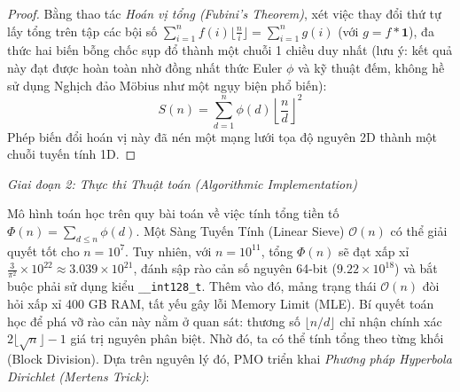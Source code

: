 \documentclass{article}
\begin{document}
\begin{proof}
Bằng thao tác \textit{Hoán vị tổng (Fubini's Theorem)}, xét việc thay đổi thứ tự lấy tổng trên tập các bội số $\sum_{i=1}^n f(i) \lfloor \frac{n}{i} \rfloor = \sum_{i=1}^n g(i)$ (với $g = f * \mathbf{1}$), đa thức hai biến bỗng chốc sụp đổ thành một chuỗi 1 chiều duy nhất (lưu ý: kết quả này đạt được hoàn toàn nhờ đồng nhất thức Euler $\phi$ và kỹ thuật đếm, không hề sử dụng Nghịch đảo Möbius như một ngụy biện phổ biến):
\begin{equation*}
 S(n) = \sum_{d=1}^n \phi(d) \left\lfloor \frac{n}{d} \right\rfloor^2
\end{equation*}
Phép biến đổi hoán vị này đã nén một mạng lưới tọa độ nguyên 2D thành một chuỗi tuyến tính 1D.
\end{proof}

\vspace{0.5em}\noindent\emph{Giai đoạn 2: Thực thi Thuật toán (Algorithmic Implementation)}

Mô hình toán học trên quy bài toán về việc tính tổng tiền tố $\Phi(n) = \sum_{d \le n} \phi(d)$. Một Sàng Tuyến Tính (Linear Sieve) $\mathcal{O}(n)$ có thể giải quyết tốt cho $n=10^7$. Tuy nhiên, với $n=10^{11}$, tổng $\Phi(n)$ sẽ đạt xấp xỉ $\frac{3}{\pi^2} \times 10^{22} \approx 3.039 \times 10^{21}$, đánh sập rào cản số nguyên 64-bit ($9.22 \times 10^{18}$) và bắt buộc phải sử dụng kiểu \texttt{\_\_int128\_t}. Thêm vào đó, mảng trạng thái $\mathcal{O}(n)$ đòi hỏi xấp xỉ 400 GB RAM, tất yếu gây lỗi Memory Limit (MLE). Bí quyết toán học để phá vỡ rào cản này nằm ở quan sát: thương số $\lfloor n/d \rfloor$ chỉ nhận chính xác $2\lfloor\sqrt{n}\rfloor - 1$ giá trị nguyên phân biệt. Nhờ đó, ta có thể tính tổng theo từng khối (Block Division). Dựa trên nguyên lý đó, PMO triển khai \textit{Phương pháp Hyperbola Dirichlet (Mertens Trick)}:
\end{document}
